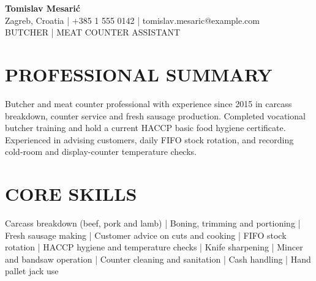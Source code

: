 \documentclass[11pt,a4paper]{article}
\begin{document}
\begin{center}
{\Huge\bfseries\color{primarycolor} Tomislav Mesarić}\\[0.35em]
{\small Zagreb, Croatia | +385 1 555 0142 | tomislav.mesaric@example.com}\\[0.3em]
{\large\color{accentcolor} BUTCHER | MEAT COUNTER ASSISTANT}
\end{center}

\section*{PROFESSIONAL SUMMARY}
Butcher and meat counter professional with experience since 2015 in carcass breakdown, counter service and fresh sausage production. Completed vocational butcher training and hold a current HACCP basic food hygiene certificate. Experienced in advising customers, daily FIFO stock rotation, and recording cold-room and display-counter temperature checks.

\section*{CORE SKILLS}
Carcass breakdown (beef, pork and lamb) | Boning, trimming and portioning | Fresh sausage making | Customer advice on cuts and cooking | FIFO stock rotation | HACCP hygiene and temperature checks | Knife sharpening | Mincer and bandsaw operation | Counter cleaning and sanitation | Cash handling | Hand pallet jack use
\end{document}
